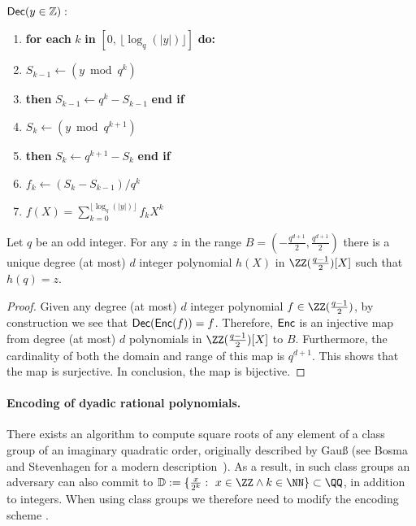  \begin{minipage}{\textwidth}
\begin{mdframed}
\begin{flushleft}
	$\textsf{{Dec}}(y \in \mathbb{Z}):$
	\begin{enumerate}[nolistsep]
	    \item \textbf{for each} $k$ \textbf{in} $[0, \, \lfloor \log_q(|y|)\rfloor]$ \textbf{do:}\\
		\item \pcind[1] $S_{k-1} \gets (y \bmod q^{k})$
		\item \pcind[1]  \textbf{then} $S_{k-1} \gets q^{k}-S_{k-1}$ \textbf{end if}
		\item \pcind[1] $S_k \gets (y \bmod q^{k+1})$
		\item \pcind[1]  \textbf{then} $S_{k} \gets q^{k+1}-S_{k}$ \textbf{end if}
		\item \pcind[1] $f_k \gets (S_{k} - S_{k-1}) / q^k$
		\item \pcreturn $f(X) = \sum_{k=0}^{\lfloor \log_q(|y|)\rfloor} f_k X^k$
	\end{enumerate} 
\end{flushleft}
\end{mdframed}
\end{minipage}

\begin{fact} \label{EncodingBijective}
Let $q$ be an odd integer. For any $z$ in the range $B = (-\frac{q^{d+1}}{2}, \frac{q^{d+1}}{2})$ there is a unique degree (at most) $d$ integer polynomial $h(X)$ in $\ZZ(\frac{q-1}{2})[X]$ such that $h(q) = z$. 
\end{fact}
\begin{proof}
Given any degree (at most) $d$ integer polynomial $f \in \ZZ(\frac{q-1}{2})$, by construction we see that $\textsf{{Dec}}(\textsf{{Enc}}(f)) = f$. Therefore, $\textsf{{Enc}}$ is an injective map from degree (at most) $d$ polynomials in $\ZZ(\frac{q-1}{2})[X]$ to $B$. Furthermore, the cardinality of both the domain and range of this map is $q^{d+1}$. This shows that the map is surjective. In conclusion, the map is bijective. 
\end{proof}

\paragraph{Encoding of dyadic rational polynomials.}
There exists an algorithm to compute square roots of any element of a class group of an imaginary quadratic order, originally described by Gauß (see Bosma and Stevenhagen for a modern description~\cite{jtn/BosSte96}). As a result, in such class groups an adversary can also commit to  $\mathbb{D}:=\{\frac{x}{2^k} : \ x \in \ZZ \wedge k \in \NN\}\subset \QQ$, in addition to integers. When using class groups we therefore need to modify the encoding scheme . 

